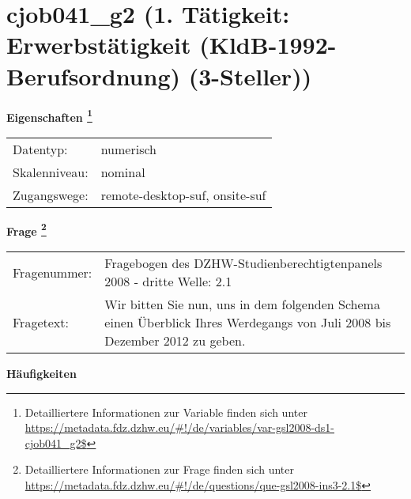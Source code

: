 
    \setcounter{footnote}{0}

    \vspace*{-1.8cm}
	\section{cjob041\_g2 (1. Tätigkeit: Erwerbstätigkeit (KldB-1992-Berufsordnung) (3-Steller))}
	\label{section:cjob041_g2}



    \vspace*{0.5cm}
    \noindent\textbf{Eigenschaften
	\footnote{Detailliertere Informationen zur Variable finden sich unter
		\url{https://metadata.fdz.dzhw.eu/\#!/de/variables/var-gsl2008-ds1-cjob041_g2$}}}\\
	\begin{tabularx}{\hsize}{@{}lX}
	Datentyp: & numerisch \\
	Skalenniveau: & nominal \\
	Zugangswege: &
	  remote-desktop-suf, 
	  onsite-suf
 \\
    \end{tabularx}



				\vspace*{0.5cm}
                \noindent\textbf{Frage
	                \footnote{Detailliertere Informationen zur Frage finden sich unter
		              \url{https://metadata.fdz.dzhw.eu/\#!/de/questions/que-gsl2008-ins3-2.1$}}}\\
				\begin{tabularx}{\hsize}{@{}lX}
					Fragenummer: &
					  Fragebogen des DZHW-Studienberechtigtenpanels 2008 - dritte Welle:
					  2.1
 \\
					Fragetext: & Wir bitten Sie nun, uns in dem folgenden Schema einen Überblick Ihres Werdegangs von Juli 2008 bis Dezember 2012 zu geben. \\
				\end{tabularx}





        		\vspace*{0.5cm}
                \noindent\textbf{Häufigkeiten}

